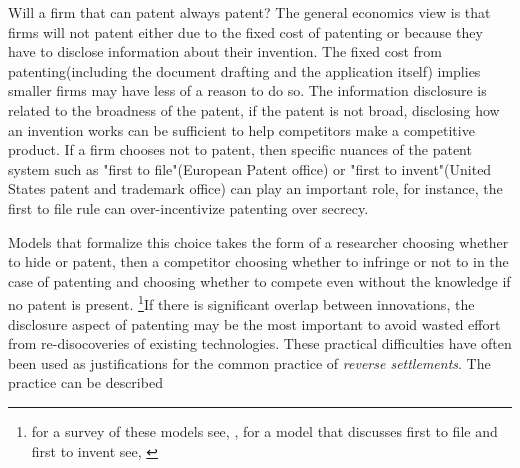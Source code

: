 \documentclass[12pt]{article}
\numberwithin{equation}{section}
\begin{document}
Will a firm that can patent always patent? The general economics view is that firms will not patent either due to the fixed cost of patenting or because they have to disclose information about their invention. The fixed cost from patenting(including the document drafting and the application itself) implies smaller firms may have less of a reason to do so. The information disclosure is related to the broadness of the patent, if the patent is not broad, disclosing how an invention works can be sufficient to help competitors make a competitive product. If a firm chooses not to patent, then specific nuances of the patent system such as "first to file"(European Patent office) or "first to invent"(United States patent and trademark office) can play an important role, for instance, the first to file rule can over-incentivize patenting over secrecy. 


Models that formalize this choice takes the form of a researcher choosing whether to hide or patent, then a competitor choosing whether to infringe or not to in the case of patenting and choosing whether to compete even without the knowledge if no patent is present. \footnote{for a survey of these models see, \cite{Hall2014}, for a model that discusses first to file and first to invent see, \cite{Scotchmer1990} }If there is significant overlap between innovations, the disclosure aspect of patenting may be the most important to avoid wasted effort from re-disocoveries of existing technologies\cite{Kultti2007}. These practical difficulties have often been used as justifications for the common practice of \textit{reverse settlements}. The practice can be described  

\end{document}
